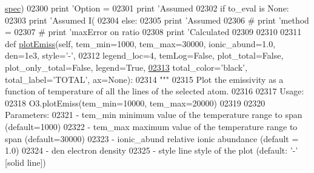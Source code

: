 \begin{DoxyCode}
{{{{{{{{{{{{{{{      \hyperlink{classpyneb_1_1core_1_1pynebcore_1_1_atom_a02c0f7146a2f5b8eac765a453c763797}{spec})
02300         \textcolor{keywordflow}{print} \textcolor{stringliteral}{'Option = %
02301         \textcolor{keywordflow}{print} \textcolor{stringliteral}{'Assumed %
02302         \textcolor{keywordflow}{if} to\_eval \textcolor{keywordflow}{is} \textcolor{keywordtype}{None}:
02303             \textcolor{keywordflow}{print} \textcolor{stringliteral}{'Assumed I(%
02304         \textcolor{keywordflow}{else}:
02305             \textcolor{keywordflow}{print} \textcolor{stringliteral}{'Assumed %
02306 \textcolor{comment}{#        print 'method = %
02307 \textcolor{comment}{#        print 'maxError on ratio %
02308         \textcolor{keywordflow}{print} \textcolor{stringliteral}{'Calculated %
02309 
02310 
02311     \textcolor{keyword}{def }\hyperlink{classpyneb_1_1core_1_1pynebcore_1_1_atom_adc2de658da17347204f430aff728650b}{plotEmiss}(self, tem\_min=1000, tem\_max=30000, ionic\_abund=1.0, den=1e3, style='-',
02312                   legend\_loc=4, temLog=\textcolor{keyword}{False}, plot\_total=\textcolor{keyword}{False}, plot\_only\_total=\textcolor{keyword}{False}, legend=\textcolor{keyword}{True},
\hypertarget{pynebcore_8py_source_l02313}{}\hyperlink{classpyneb_1_1core_1_1pynebcore_1_1_atom_adc2de658da17347204f430aff728650b}{02313}                   total\_color=\textcolor{stringliteral}{'black'}, total\_label=\textcolor{stringliteral}{'TOTAL'}, ax=\textcolor{keywordtype}{None}):
02314         \textcolor{stringliteral}{""" }
02315 \textcolor{stringliteral}{        Plot the emissivity as a function of temperature of all the lines of the selected atom.  }
02316 \textcolor{stringliteral}{}
02317 \textcolor{stringliteral}{        Usage: }
02318 \textcolor{stringliteral}{            O3.plotEmiss(tem\_min=10000, tem\_max=20000)}
02319 \textcolor{stringliteral}{        }
02320 \textcolor{stringliteral}{        Parameters:}
02321 \textcolor{stringliteral}{            - tem\_min         minimum value of the temperature range to span (default=1000)}
02322 \textcolor{stringliteral}{            - tem\_max         maximum value of the temperature range to span (default=30000)}
02323 \textcolor{stringliteral}{            - ionic\_abund     relative ionic abundance (default = 1.0)}
02324 \textcolor{stringliteral}{            - den             electron density}
02325 \textcolor{stringliteral}{            - style           line style of the plot (default: '-' [solid line])}
}}}}}}}}}}}}}}}}}}}}}}
\end{DoxyCode}
